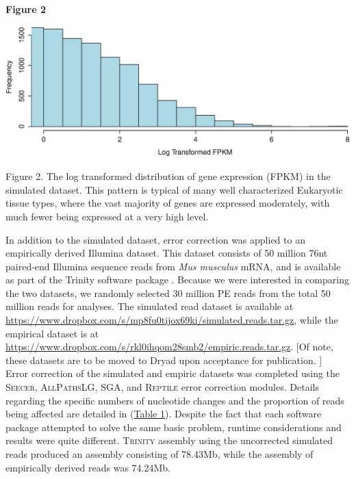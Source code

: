 \documentclass[11pt]{article}
\begin{document}
\vspace{50mm}
\textbf{\hypertarget{Figure 2}{Figure 2}} \\
\centerline{\includegraphics[width=20.0\baselineskip]{newfig2.eps}}
\begin{changemargin}{2cm}{2cm} 
Figure 2.  The log transformed distribution of gene expression (FPKM) in the simulated dataset. This pattern is typical of many well characterized Eukaryotic tissue types, where the vast majority of genes are expressed moderately, with much fewer being expressed at a very high level. 
\end{changemargin}
\vspace{10mm}

\noindent
In addition to the simulated dataset, error correction was applied to an empirically derived Illumina dataset. This dataset consists of 50 million 76nt paired-end Illumina sequence reads from \textit{Mus musculus} mRNA, and is available as part of the Trinity software package \citep{Haas:jq,Grabherr:2011jb}. Because we were interested in comparing the two datasets, we randomly selected 30 million PE reads from the total 50 million reads for analyses.  The simulated read dataset is available at \url{https://www.dropbox.com/s/mp8fu0tijox69ki/simulated.reads.tar.gz}, while the empirical dataset is at \url{https://www.dropbox.com/s/rkl0ihqom28smb2/empiric.reads.tar.gz}.  [Of note, these datasets are to be moved to Dryad upon acceptance for publication. ]\\

\noindent
Error correction of the simulated and empiric datasets was completed using the \textsc{Seecer}, \textsc{AllPathsLG}, \textsc{SGA}, and \textsc{Reptile} error correction modules.  Details regarding the specific numbers of nucleotide changes and the proportion of reads being affected are detailed in (\hyperlink{Table 1}{Table 1}). Despite the fact that each software package attempted to solve the same basic problem, runtime considerations and results were quite different. \textsc{Trinity} assembly using the uncorrected simulated reads produced an assembly consisting of 78.43Mb, while the assembly of empirically derived reads was 74.24Mb.  \\
\end{document}
